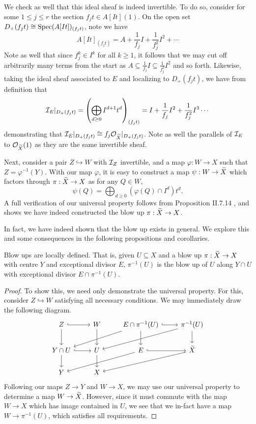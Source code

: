 We check as well that this ideal sheaf is indeed invertible.
To do so, consider for some $1 \leq j \leq r$ the section $f_j t \in A[It](1)$.
On the open set $D_+(f_jt) \cong {\rm Spec}(A[It])_{(f_jt)}$, note we have
\[
    A[It]_{(f_jt)}
        = A + \frac{1}{f_j}I + \frac{1}{f_j^2}I^2 + \cdots
\]
Note as well that since $f_j^k \in I^k$ for all $k \geq 1$, 
it follows that we may cut off arbitrarily many terms from the start as $A \subseteq \frac{1}{f_j}I \subseteq \frac{1}{f_j^2}I^2$ and so forth.
Likewise, taking the ideal sheaf associated to $E$ and localizing to $D_+(f_jt)$,
we have from definition that
\[
    \mathcal{I}_E|_{D_+(f_jt)}
    = \left(\bigoplus_{d \geq 0} I^{d + 1}t^d\right)_{(f_jt)}
    = I + \frac{1}{f_j}I^2 + \frac{1}{f_j^2}I^3 \cdots
\]
demonstrating that $\mathcal{I}_E|_{D_+(f_j t)} \cong f_j \mathcal{O}_{\widetilde X}|_{D_+(f_j t)}$.
Note as well the parallels of $\mathcal{I}_E$ to $\mathcal{O}_{\widetilde X}(1)$ as they are the same invertible sheaf.

Next, consider a pair $Z \hookrightarrow W$ with $\mathcal{I}_Z$ invertible,
and a map $\varphi : W \to X$ such that $Z = \varphi^{-1}(Y)$.
With our map $\varphi$, it is easy to construct a map $\psi : W \to \widetilde X$ which factors through $\pi : \widetilde X \to X$ as for any $Q \in W$,
\[
    \psi(Q)= \bigoplus_{d \geq 0} (\varphi(Q) \cap I^d) t^d.
\]
A full verification of our universal property follows from Proposition II.7.14 \cite{Hartshorne_2013},
and shows we have indeed constructed the blow up $\pi : \widetilde X \to X$.

In fact, we have indeed shown that the blow up exists in general.
We explore this and some consequences in the following propositions and corollaries.

\begin{proposition}
    Blow ups are locally defined. 
    That is, given $U \subseteq X$ and a blow up $\pi : \widetilde X \to X$ with centre $Y$ and exceptional divisor $E$,
    $\pi^{-1}(U)$ is the blow up of $U$ along $Y \cap U$ with exceptional divisor $E\cap \pi^{-1}(U)$.
\end{proposition}

\begin{proof}
    To show this, we need only demonstrate the universal property.
    For this, consider $Z \hookrightarrow W$ satisfying all necessary conditions. 
    We may immediately draw the following diagram.
    \[
        \begin{tikzcd}
            Z \arrow[r, hook] \arrow[d] & W \arrow[d] & E \cap \pi^{-1}(U) \arrow[r, hook] \arrow[d] \arrow[dll] & \pi^{-1}(U) \arrow[d] \arrow[dll] \\
            Y \cap U \arrow[r, hook] \arrow[d] & U \arrow[d] & E \arrow[r, hook] \arrow[dll] & \wt X \arrow[dll] \\
            Y & X
        \end{tikzcd}
    \]
    Following our maps $Z \to Y$ and $W \to X$, 
    we may use our universal property to determine a map $W \to \widetilde X$.
    However, since it must commute with the map $W \to X$ which has image contained in $U$,
    we see that we in-fact have a map $W \to \pi^{-1}(U)$,
    which satisfies all requirements.
\end{proof}

